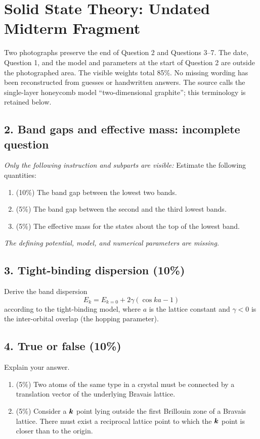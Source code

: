 \chapter{Solid State Theory: Undated Midterm Fragment}
\label{q:theory-undated-midterm-fragment}
\begin{sourceNote}
Two photographs preserve the end of Question 2 and Questions 3--7. The date, Question 1, and the model and parameters at the start of Question 2 are outside the photographed area. The visible weights total 85\%. No missing wording has been reconstructed from guesses or handwritten answers. The source calls the single-layer honeycomb model ``two-dimensional graphite''; this terminology is retained below.
\end{sourceNote}

\section*{2. Band gaps and effective mass: incomplete question}
\emph{Only the following instruction and subparts are visible:} Estimate the following quantities:
\begin{enumerate}[label=(\alph*)]
\item (10\%) The band gap between the lowest two bands.
\item (5\%) The band gap between the second and the third lowest bands.
\item (5\%) The effective mass for the states about the top of the lowest band.
\end{enumerate}
\emph{The defining potential, model, and numerical parameters are missing.}

\section*{3. Tight-binding dispersion (10\%)}
Derive the band dispersion
\[
E_k=E_{k=0}+2\gamma(\cos ka-1)
\]
according to the tight-binding model, where $a$ is the lattice constant and $\gamma<0$ is the inter-orbital overlap (the hopping parameter).

\section*{4. True or false (10\%)}
Explain your answer.
\begin{enumerate}[label=(\alph*)]
\item (5\%) Two atoms of the same type in a crystal must be connected by a translation vector of the underlying Bravais lattice.
\item (5\%) Consider a $\boldsymbol{k}$ point lying outside the first Brillouin zone of a Bravais lattice. There must exist a reciprocal lattice point to which the $\boldsymbol{k}$ point is closer than to the origin.
\end{enumerate}

